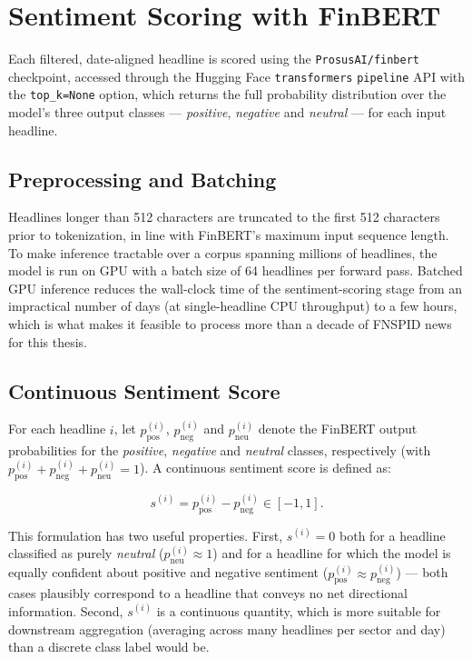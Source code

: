 \section{Sentiment Scoring with FinBERT}
\label{sec:meth-finbert}

Each filtered, date-aligned headline is scored using the
\texttt{ProsusAI/finbert} checkpoint, accessed through the Hugging Face
\texttt{transformers} \texttt{pipeline} API with the
\texttt{top\_k=None} option, which returns the full probability
distribution over the model's three output classes --- \emph{positive},
\emph{negative} and \emph{neutral} --- for each input headline.

\subsection{Preprocessing and Batching}

Headlines longer than 512 characters are truncated to the first 512
characters prior to tokenization, in line with FinBERT's maximum input
sequence length. To make inference tractable over a corpus spanning
millions of headlines, the model is run on GPU with a batch size of 64
headlines per forward pass. Batched GPU inference reduces the wall-clock
time of the sentiment-scoring stage from an impractical number of days
(at single-headline CPU throughput) to a few hours, which is what makes it
feasible to process more than a decade of FNSPID news for this thesis.

\subsection{Continuous Sentiment Score}

For each headline $i$, let $p_{\text{pos}}^{(i)}$, $p_{\text{neg}}^{(i)}$
and $p_{\text{neu}}^{(i)}$ denote the FinBERT output probabilities for the
\emph{positive}, \emph{negative} and \emph{neutral} classes, respectively
(with $p_{\text{pos}}^{(i)} + p_{\text{neg}}^{(i)} + p_{\text{neu}}^{(i)} =
1$). A continuous sentiment score is defined as:

\begin{equation}
  \label{eq:sentiment-score}
  s^{(i)} = p_{\text{pos}}^{(i)} - p_{\text{neg}}^{(i)} \in [-1, 1].
\end{equation}

This formulation has two useful properties. First, $s^{(i)} = 0$ both for
a headline classified as purely \emph{neutral} ($p_{\text{neu}}^{(i)}
\approx 1$) and for a headline for which the model is equally confident
about positive and negative sentiment ($p_{\text{pos}}^{(i)} \approx
p_{\text{neg}}^{(i)}$) --- both cases plausibly correspond to a headline
that conveys no net directional information. Second, $s^{(i)}$ is a
continuous quantity, which is more suitable for downstream aggregation
(averaging across many headlines per sector and day) than a discrete
class label would be.

